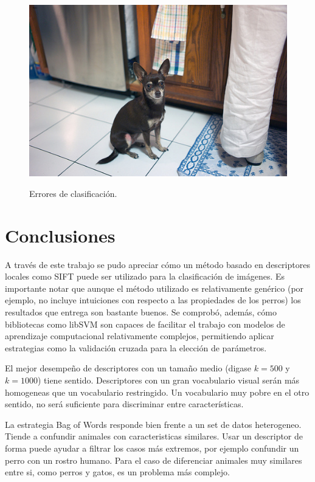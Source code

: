 \documentclass[12pt]{article}
\begin{document}
\begin{figure}[H]
{  \includegraphics[scale=0.4]{../dogs/eval/194.jpg}}
    \caption{Errores de clasificación.}
\end{figure}

\section{Conclusiones}

A través de este trabajo se pudo apreciar cómo un método basado en descriptores
locales como SIFT puede ser utilizado para la clasificación de imágenes. Es
importante notar que aunque el método utilizado es relativamente genérico (por
ejemplo, no incluye intuiciones con respecto a las propiedades de los perros)
los resultados que entrega son bastante buenos. Se comprobó, además, cómo
bibliotecas como libSVM son capaces de facilitar el trabajo con modelos de
aprendizaje computacional relativamente complejos, permitiendo aplicar
estrategias como la validación cruzada para la elección de parámetros.

El mejor desempeño de descriptores con un tamaño medio (digase $k=500$ y $k=1000$) tiene sentido.
Descriptores con un gran vocabulario visual serán más homogeneas que un vocabulario restringido.
Un vocabulario muy pobre en el otro sentido, no será suficiente para discriminar entre características.

La estrategia Bag of Words responde bien frente a un set de datos heterogeneo. Tiende a confundir animales con caracteristicas similares.
Usar un descriptor de forma puede ayudar a filtrar los casos más extremos, por ejemplo confundir un perro con un rostro humano.
Para el caso de diferenciar animales muy similares entre si, como perros y gatos, es un problema más complejo.





\end{document}
